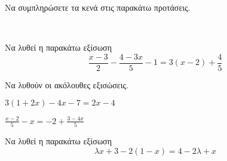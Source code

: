 \documentclass[twoside,nofonts,internet,math,spyros]{frontisthrio-diag}
\begin{document}
\begin{thema}
\begin{erwthma}
\begin{alist}
\begin{multicols}{4}
\begin{rlist}
\item 
\item 
\item 
\item 
\end{rlist}
\end{multicols}
\item 
\begin{multicols}{4}
\begin{rlist}
\item 
\item 
\item 
\item 
\end{rlist}
\end{multicols}
\item 
\begin{multicols}{4}
\begin{rlist}
\item 
\item 
\item 
\item 
\end{rlist}
\end{multicols}
\end{alist}
\item Να συμπληρώσετε τα κενά στις παρακάτω προτάσεις.
\begin{alist}
\item 
\end{alist}
\end{erwthma}
\item \mbox{}\\\vspace{-5mm}
\begin{erwthma}
\item Να λυθεί η παρακάτω εξίσωση
\[ \frac{x-3}{2}-\frac{4-3x}{5}-1=3(x-2)+\frac{4}{5} \]
\item 
Να λυθούν οι ακόλουθες εξισώσεις.
\begin{multicols}{2}
\begin{alist}
\item $ 3(1+2x)-4x-7=2x-4 $
\item $ \frac{x-2}{5}-x=-2+\frac{3-4x}{5} $
\end{alist}
\end{multicols}
\item Να λυθεί η παρακάτω εξίσωση
\[ \lambda x+3-2(1-x)=4-2\lambda +x \]
\begin{multicols}{2}

\end{multicols}
\end{erwthma}
\end{thema}
\end{document}
